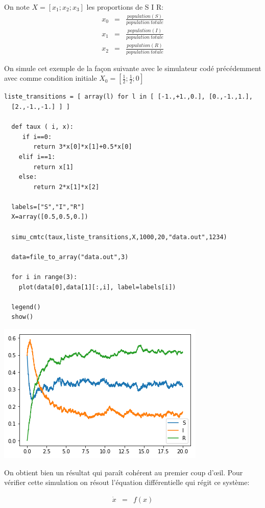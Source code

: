 \documentclass[a4paper,12pt]{report}
\def\D{\displaystyle}
\begin{document}
On note $\D X=\left[ x_1;x_2;x_3\right]$ les proportions de S I R:
\begin{eqnarray*}
  x_0 &=& \frac{population(S)}{population\ totale} \\
  x_1 &=& \frac{population(I)}{population\ totale} \\
  x_2 &=& \frac{population(R)}{population\ totale}
\end{eqnarray*}

On simule cet exemple de la façon suivante avec le simulateur codé
précédemment avec comme condition initiale $\D X_0=\left[\frac{1}{2};\frac{1}{2};0\right]$ \\
\newpage
\begin{lstlisting}[frame=single]
  liste_transitions = [ array(l) for l in [ [-1.,+1.,0.], [0.,-1.,1.],
  [2.,-1.,-1.] ] ]

  def taux ( i, x):
     if i==0:
        return 3*x[0]*x[1]+0.5*x[0]
    elif i==1:
        return x[1]
    else:
        return 2*x[1]*x[2]
    
  labels=["S","I","R"]
  X=array([0.5,0.5,0.])

  simu_cmtc(taux,liste_transitions,X,1000,20,"data.out",1234)

  data=file_to_array("data.out",3)

  for i in range(3):
    plot(data[0],data[1][:,i], label=labels[i])

  legend()
  show()
\end{lstlisting}

\begin{center}
  \includegraphics{figure1.png}
\end{center}

On obtient bien un résultat qui paraît cohérent au premier coup
d'\oe il. Pour vérifier cette simulation on résout l'équation
différentielle qui régit ce système:

\begin{eqnarray*}
  \dot{x} &=& f(x)
\end{eqnarray*}
\end{document}
